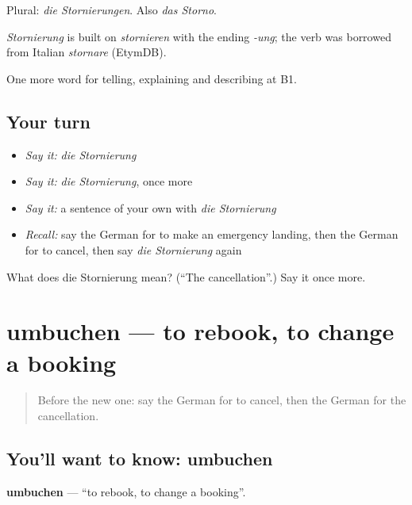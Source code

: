 Plural: \emph{die Stornierungen}. Also \emph{das Storno}.

\begin{cousinweb}
\emph{Stornierung} is built on \emph{stornieren} with the ending \emph{-ung}; the verb was borrowed from Italian \emph{stornare} (EtymDB).
\end{cousinweb}

\begin{grammarlens}[title={What you've built}]
One more word for telling, explaining and describing at B1.
\end{grammarlens}

\subsection*{Your turn}
\begin{itemize}
\raggedright
  \item \emph{Say it:} \emph{die Stornierung}
  \item \emph{Say it:} \emph{die Stornierung}, once more
  \item \emph{Say it:} a sentence of your own with \emph{die Stornierung}
  \item \emph{Recall:} say the German for to make an emergency landing, then the German for to cancel, then say \emph{die Stornierung} again
\end{itemize}

\begin{tcolorbox}[breakable,colback=teal!4,colframe=teal!35!black,title={Before you move on}]
What does die Stornierung mean? (\textquotedblleft{}The cancellation\textquotedblright{}.) Say it once more.
\end{tcolorbox}
\section[umbuchen]{umbuchen — to rebook, to change a booking}

\label{lesson:GE-C420-umbuchen}



\begin{quote}
Before the new one: say the German for to cancel, then the German for the cancellation.
\end{quote}

\subsection*{You'll want to know: umbuchen}
\textbf{umbuchen} — \textquotedblleft{}to rebook, to change a booking\textquotedblright{}.

